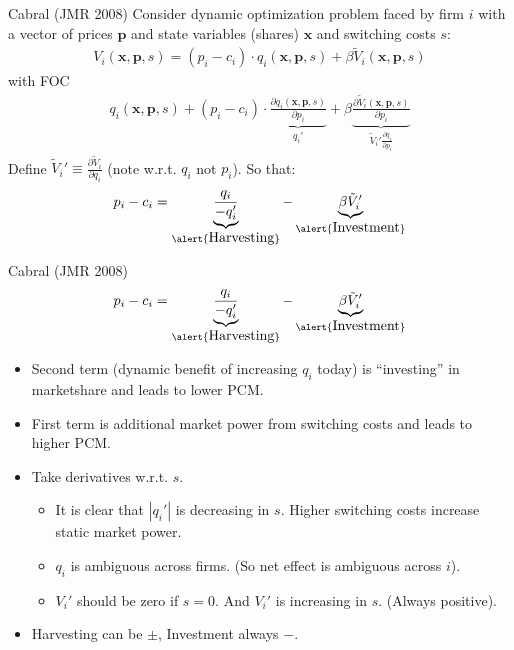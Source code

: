 \documentclass[xcolor=pdftex,dvipsnames,table,mathserif,aspectratio=169]{beamer}
\begin{document}
\begin{frame}{Cabral (JMR 2008)}
Consider dynamic optimization problem faced by firm $i$ with a vector of prices $\mathbf{p}$ and state variables (shares) $\mathbf{x}$ and switching costs $s$:
\begin{eqnarray*}
V_i(\mathbf{x},\mathbf{p},s) = (p_i - c_i) \cdot q_i(\mathbf{x},\mathbf{p},s) + \beta \tilde{V}_i(\mathbf{x},\mathbf{p},s)
\end{eqnarray*}
with FOC
\vspace{-.3cm}
\begin{eqnarray*}
q_i(\mathbf{x},\mathbf{p},s) +  (p_i - c_i) \cdot \underbrace{\frac{\partial q_i(\mathbf{x},\mathbf{p},s)}{\partial p_i}}_{q_i'} +  \beta  \underbrace{\frac{\partial \tilde{V}_i(\mathbf{x},\mathbf{p},s)}{\partial p_i}}_{\tilde{V}_i' \frac{\partial q_i}{\partial p_i}}
\end{eqnarray*}
\vspace{-.3cm}
Define $\tilde{V}_i' \equiv \frac{\partial \tilde{V}_i}{\partial q_i}$ (note w.r.t. $q_i$ not $p_i$). So that:
\begin{eqnarray*}
p_i - c_i = \underbrace{\frac{q_i}{-q_i'}}_{\alert{\mbox{Harvesting}}} - \underbrace{\beta \tilde{V}_i'}_{\alert{\mbox{Investment}}}
\end{eqnarray*}
\end{frame} 

\begin{frame}{Cabral (JMR 2008)}
\begin{eqnarray*}
p_i - c_i = \underbrace{\frac{q_i}{-q_i'}}_{\alert{\mbox{Harvesting}}} - \underbrace{\beta \tilde{V}_i'}_{\alert{\mbox{Investment}}}
\end{eqnarray*}
\vspace{-.3cm}
\begin{itemize}
\item Second term (dynamic benefit of increasing $q_i$ today) is ``investing'' in marketshare and leads to lower PCM.
\item First term is additional market power from switching costs and leads to higher PCM.
\item Take derivatives w.r.t. $s$.
\begin{itemize}
\item It is clear that $|q_i'|$ is decreasing in $s$. Higher switching costs increase static market power.
\item $q_i$ is ambiguous across firms. (So net effect is ambiguous across $i$).
\item $V_i'$ should be zero if $s=0$. And $V_i'$ is increasing in $s$. (Always positive).
\end{itemize}
\item Harvesting can be $\pm$, Investment always $-$.
\end{itemize}
\end{frame} 
\end{document}
